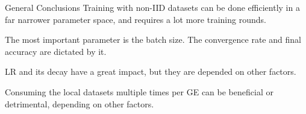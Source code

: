\begin{frame}{General Conclusions}
% 
Training with non-IID datasets can be done efficiently in a far narrower parameter space, and requires a lot more training rounds.

The most important parameter is the batch size. The convergence rate and final accuracy are dictated by it.

LR and its decay have a great impact, but they are depended on other factors.

Consuming the local datasets multiple times per GE can be beneficial or detrimental, depending on other factors.
\end{frame}